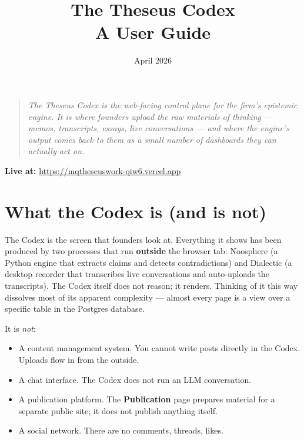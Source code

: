 \documentclass[11pt,letterpaper]{article}
\title{\textbf{The Theseus Codex}\\[4pt]\large A User Guide}
\date{April 2026}
\author{}
\newcommand{\page}[1]{\textbf{#1}}
\begin{document}
\maketitle
\thispagestyle{empty}

\vspace{2em}

\begin{quote}
\itshape
The Theseus Codex is the web-facing control plane for the firm's epistemic engine. It is where founders upload the raw materials of thinking --- memos, transcripts, essays, live conversations --- and where the engine's output comes back to them as a small number of dashboards they can actually act on.
\end{quote}

\vspace{1em}
\textbf{Live at:} \url{https://mqtheseuswork-qiw6.vercel.app}

\vspace{2em}

\tableofcontents
\newpage

\section{What the Codex is (and is not)}

The Codex is the screen that founders look at. Everything it shows has been produced by two processes that run \textbf{outside} the browser tab: Noosphere (a Python engine that extracts claims and detects contradictions) and Dialectic (a desktop recorder that transcribes live conversations and auto-uploads the transcripts). The Codex itself does not reason; it renders. Thinking of it this way dissolves most of its apparent complexity --- almost every page is a view over a specific table in the Postgres database.

It is \emph{not}:
\begin{itemize}[leftmargin=*,itemsep=0.2em]
  \item A content management system. You cannot write posts directly in the Codex. Uploads flow in from the outside.
  \item A chat interface. The Codex does not run an LLM conversation.
  \item A publication platform. The \page{Publication} page prepares material for a separate public site; it does not publish anything itself.
  \item A social network. There are no comments, threads, likes.
\end{itemize}
\end{document}
